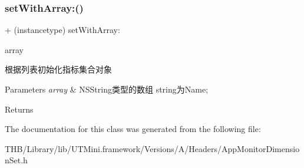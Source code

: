 \subsubsection{\texorpdfstring{set\+With\+Array\+:()}{setWithArray:()}}
{\footnotesize\ttfamily + (instancetype) set\+With\+Array\+: \begin{DoxyParamCaption}\item[{(N\+S\+Array $\ast$)}]{array }\end{DoxyParamCaption}}

根据列表初始化指标集合对象


\begin{DoxyParams}{Parameters}
{\em array} & N\+S\+String类型的数组 string为\+Name; \\
\hline
\end{DoxyParams}
\begin{DoxyReturn}{Returns}

\end{DoxyReturn}


The documentation for this class was generated from the following file\+:\begin{DoxyCompactItemize}
\item 
T\+H\+B/\+Library/lib/\+U\+T\+Mini.\+framework/\+Versions/\+A/\+Headers/App\+Monitor\+Dimension\+Set.\+h\end{DoxyCompactItemize}

